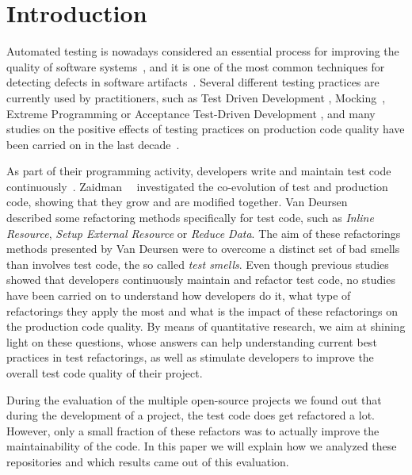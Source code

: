 
\section{Introduction}
Automated testing is nowadays considered an essential process for 
improving the quality of software systems~\cite{Bertolino2007,Myers2004}, and it is
one of the most common techniques for detecting defects in 
software artifacts~\cite{laitenberger1998studying,van2001refactoring}.
Several different testing
practices are currently used by practitioners, such as Test Driven Development
\cite{erdogmus2010test}, Mocking~\cite{Spadini}, Extreme Programming \cite{lindstrom2004extreme} or
Acceptance Test-Driven Development \cite{aggarwal2014acceptance}, and many studies on the 
positive effects of testing practices on production code quality have
been carried on in the last decade~\cite{laitenberger1998studying,binder1996testing}. 

As part of their programming activity, developers write and maintain test code 
continuously~\cite{van2001refactoring}. Zaidman~\etal~\cite{Zaidman2008} investigated the
co-evolution of test and production code, showing that they grow and are modified together.
Van Deursen~\etal~\cite{van2001refactoring} described some refactoring methods 
specifically for test code, such as \textit{Inline Resource}, \textit{Setup External Resource}
or \textit{Reduce Data}. The aim of these refactorings methods presented by Van Deursen were
to overcome a distinct set of bad smells than involves test code, the so called \textit{test smells}.
Even though previous studies showed that developers continuously maintain and refactor test code, 
no studies have been carried on to understand how developers do it, what type of refactorings they apply the most
and what is the impact of these refactorings on the production code quality.
By means of quantitative research, we aim at shining light on these questions, whose answers
can help understanding current best practices in test refactorings, as well as
stimulate developers to improve the overall test code quality of their project.

During the evaluation of the multiple open-source projects we found out that
during the development of a project, the test code does get refactored a lot.
However, only a small fraction of these refactors was to actually improve the
maintainability of the code. In this paper we will explain how we analyzed these
repositories and which results came out of this evaluation.
